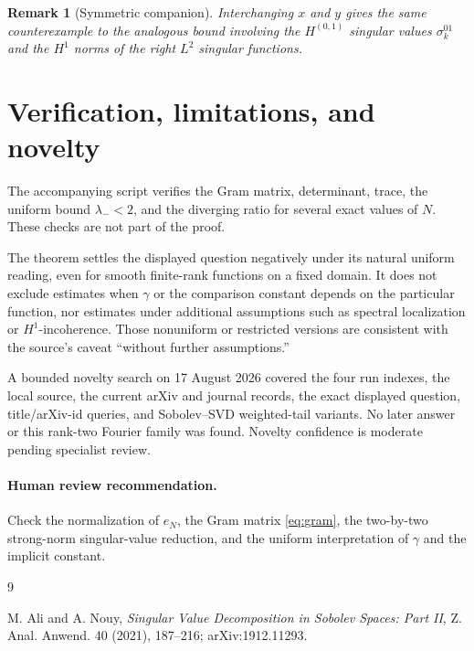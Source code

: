 \documentclass[11pt]{article}
\newtheorem{remark}[theorem]{Remark}
\begin{document}
\begin{remark}[Symmetric companion]
Interchanging $x$ and $y$ gives the same counterexample to the analogous
bound involving the $H^{(0,1)}$ singular values $\sigma_k^{01}$ and the
$H^1$ norms of the right $L^2$ singular functions.
\end{remark}

\section{Verification, limitations, and novelty}

The accompanying script verifies the Gram matrix, determinant, trace, the
uniform bound $\lambda_-<2$, and the diverging ratio for several exact values
of $N$.  These checks are not part of the proof.

The theorem settles the displayed question negatively under its natural
uniform reading, even for smooth finite-rank functions on a fixed domain.  It
does not exclude estimates when $\gamma$ or the comparison constant depends
on the particular function, nor estimates under additional assumptions such
as spectral localization or $H^1$-incoherence.  Those nonuniform or restricted
versions are consistent with the source's caveat “without further
assumptions.”

A bounded novelty search on 17 August 2026 covered the four run indexes, the
local source, the current arXiv and journal records, the exact displayed
question, title/arXiv-id queries, and Sobolev--SVD weighted-tail variants.  No
later answer or this rank-two Fourier family was found.  Novelty confidence is
moderate pending specialist review.

\paragraph{Human review recommendation.}
Check the normalization of $e_N$, the Gram matrix \eqref{eq:gram}, the
two-by-two strong-norm singular-value reduction, and the uniform
interpretation of $\gamma$ and the implicit constant.

\enlargethispage{2.5\baselineskip}
\begin{thebibliography}{9}
\small
\raggedright
{}
M. Ali and A. Nouy,
\emph{Singular Value Decomposition in Sobolev Spaces: Part II},
Z. Anal. Anwend. 40 (2021), 187--216; arXiv:1912.11293.
\end{thebibliography}
\end{document}
